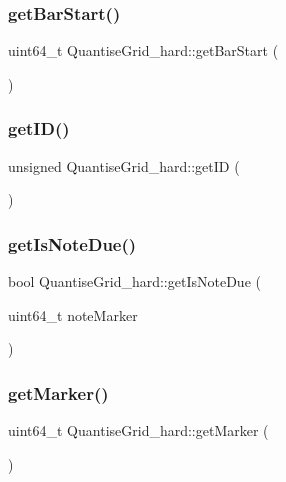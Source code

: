\subsubsection{\texorpdfstring{get\+Bar\+Start()}{getBarStart()}}
{\footnotesize\ttfamily uint64\+\_\+t Quantise\+Grid\+\_\+hard\+::get\+Bar\+Start (\begin{DoxyParamCaption}{ }\end{DoxyParamCaption})}

\mbox{\label{classQuantiseGrid__hard_adb1fb7070bc80b29e0922fc13b60cde7}} 
\subsubsection{\texorpdfstring{get\+I\+D()}{getID()}}
{\footnotesize\ttfamily unsigned Quantise\+Grid\+\_\+hard\+::get\+ID (\begin{DoxyParamCaption}{ }\end{DoxyParamCaption})}

\mbox{\label{classQuantiseGrid__hard_a30832e3feacf7bd155b077f008ac068b}} 
\subsubsection{\texorpdfstring{get\+Is\+Note\+Due()}{getIsNoteDue()}}
{\footnotesize\ttfamily bool Quantise\+Grid\+\_\+hard\+::get\+Is\+Note\+Due (\begin{DoxyParamCaption}\item[{uint64\+\_\+t}]{note\+Marker }\end{DoxyParamCaption})}

\mbox{\label{classQuantiseGrid__hard_adfaa53b529dab9d4b79fda98eee4c766}} 
\subsubsection{\texorpdfstring{get\+Marker()}{getMarker()}}
{\footnotesize\ttfamily uint64\+\_\+t Quantise\+Grid\+\_\+hard\+::get\+Marker (\begin{DoxyParamCaption}{ }\end{DoxyParamCaption})}

